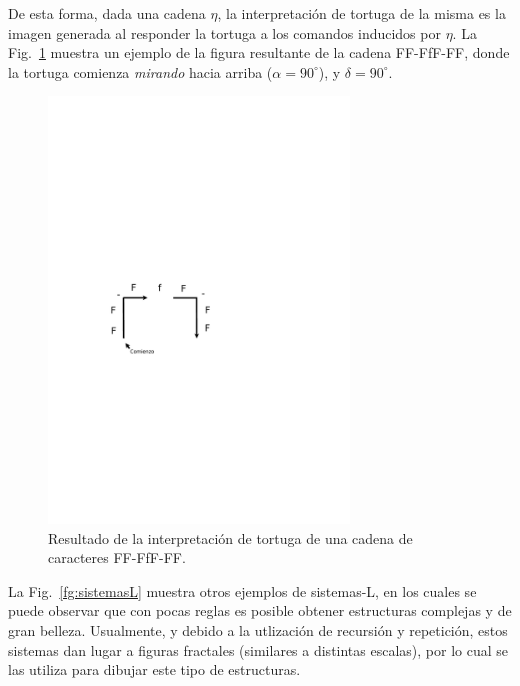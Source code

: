 De esta forma, dada una cadena $\eta$, la interpretación de tortuga de la misma es la imagen generada al responder la tortuga a los comandos inducidos por $\eta$.
La Fig.~\ref{fg:tortuga} muestra un ejemplo de la figura resultante de la cadena FF-FfF-FF, donde la tortuga comienza {\em mirando} hacia arriba ($\alpha = 90^{\circ}$), y $\delta = 90^{\circ}$.

\begin{figure}
\center
\includegraphics[width=8cm]{figures/tortuga}
\caption[Resultado de la interpretación de tortuga de una cadena de caracteres]{Resultado de la interpretación de tortuga de una cadena de caracteres FF-FfF-FF.}
\label{fg:tortuga}
\end{figure}

La Fig.~\ref{fg:sistemasL} muestra otros ejemplos de sistemas-L, en los cuales se puede observar que con pocas reglas es posible obtener estructuras complejas y de gran belleza.
Usualmente, y debido a la utlización de recursión y repetición, estos sistemas dan lugar a figuras fractales (similares a distintas escalas), por lo cual se las utiliza para dibujar este tipo de estructuras.

